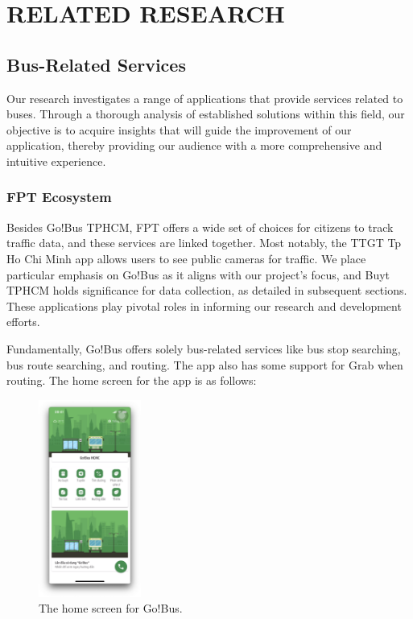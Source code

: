 %
%
\section{RELATED RESEARCH}

\subsection{Bus-Related Services}

Our research investigates a range of applications that provide services related to buses. Through a thorough analysis of established solutions within this field, our objective is to acquire insights that will guide the improvement of our application, thereby providing our audience with a more comprehensive and intuitive experience.

\subsubsection{FPT Ecosystem}

Besides Go!Bus TPHCM, FPT offers a wide set of choices for citizens to track traﬀic data, and these services are linked together. Most notably, the TTGT Tp Ho Chi Minh app allows users to see public cameras for traﬀic. We place particular emphasis on Go!Bus as it aligns with our project's focus, and Buyt TPHCM holds significance for data collection, as detailed in subsequent sections. These applications play pivotal roles in informing our research and development efforts.


Fundamentally, Go!Bus offers solely bus-related services like bus stop searching, bus route searching, and routing. The app also has some support for Grab when routing. The home screen for the app is as follows:

\begin{figure}[H]
    \centering
    \includegraphics[width=0.3\textwidth]{assets/images/Research/Bus/gobus_home.png}
    \caption{The home screen for Go!Bus.}
    \label{fig:gobus_homescreen}
\end{figure}

